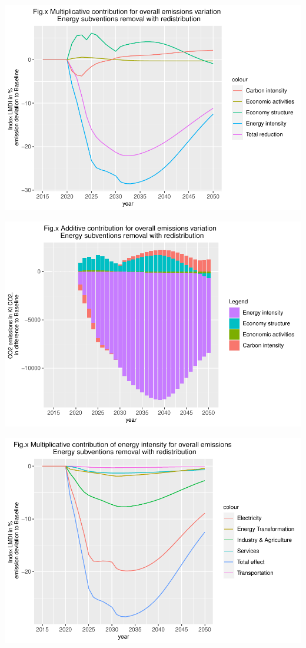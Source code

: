 \documentclass[
]{article}
\begin{document}
\includegraphics{Modele-ThreeMe-Tunisie_Sequeira_Valilou_Wang_files/figure-latex/unnamed-chunk-27-1.pdf}

\includegraphics{Modele-ThreeMe-Tunisie_Sequeira_Valilou_Wang_files/figure-latex/unnamed-chunk-28-1.pdf}

\includegraphics{Modele-ThreeMe-Tunisie_Sequeira_Valilou_Wang_files/figure-latex/unnamed-chunk-29-1.pdf}
\end{document}
